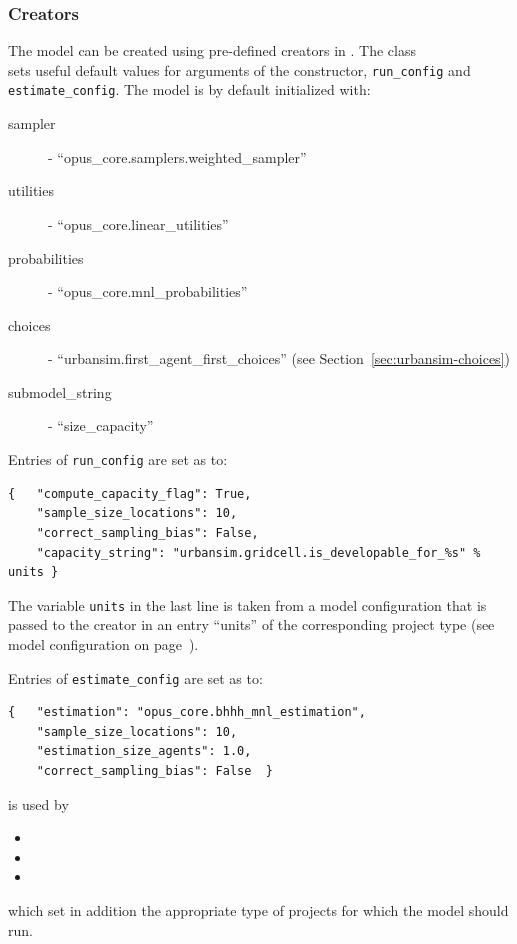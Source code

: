 \subsubsection{Creators}
%
The model \modelsindex can be created using pre-defined creators in .
The class\\
 \modelsindex sets useful default
values for arguments of the constructor, \verb|run_config| and
\verb|estimate_config|. The model \modelsindex is by default initialized with:
\begin{description}
\item[sampler] - ``opus_core.samplers.weighted_sampler''
\item[utilities] - ``opus_core.linear_utilities''
\item[probabilities] - ``opus_core.mnl_probabilities''
\item[choices] - ``urbansim.first_agent_first_choices'' (see
  Section~\ref{sec:urbansim-choices})
\item[submodel_string] - ``size_capacity''
\end{description}
Entries of \verb|run_config| are set as to:
\begin{verbatim}
{   "compute_capacity_flag": True,
    "sample_size_locations": 10,
    "correct_sampling_bias": False,
    "capacity_string": "urbansim.gridcell.is_developable_for_%s" % units }
\end{verbatim}
The variable \variablesindex \verb|units| in the last line is taken from a model \modelsindex configuration
that is passed to the creator in an entry ``units'' of the corresponding
project type (see model \modelsindex configuration on
page~\pageref{page:model-configuration}).

Entries of \verb|estimate_config| are set as to:
\begin{verbatim}
{   "estimation": "opus_core.bhhh_mnl_estimation",
    "sample_size_locations": 10,
    "estimation_size_agents": 1.0,
    "correct_sampling_bias": False  }
\end{verbatim}


 \modelsindex is used by
\begin{itemize}
\item {} \modelsindex
\item {} \modelsindex
\item {} \modelsindex
\end{itemize}
which set in addition the appropriate type of projects for which the model \modelsindex
should run.

